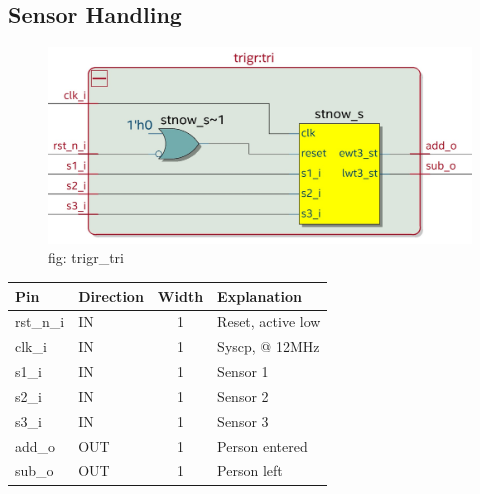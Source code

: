 \documentclass[12pt,a4 paper] {article}
\begin{document}
\subsection{Sensor Handling}
\begin{figure}[h]
	\centering	
	\includegraphics[scale=0.2]{../png/trigr_tri.png}
	\newline
	fig: trigr\_tri \\
\end{figure}
\begin{center}
	\begin{tabular}{| p{2cm} | p{2cm} | c| p{4cm} |}
		\hline
		Pin & Direction & Width & Explanation\\
		\hline	
rst\_n\_i  & IN & 1 & Reset, active low \\
\hline
clk\_i   & IN  & 1 & Syscp, @ 12MHz \\
\hline
s1\_i    & IN   & 1 &  Sensor 1 \\
\hline
s2\_i    & IN & 1 & Sensor 2\\
\hline
s3\_i  &  IN  & 1 &   Sensor 3 \\
\hline
add\_o   &  OUT  & 1 &  Person entered \\
\hline
sub\_o   & OUT & 1 &  Person left \\
\hline
	\end{tabular}
\end{center}
\newpage
\end{document}
